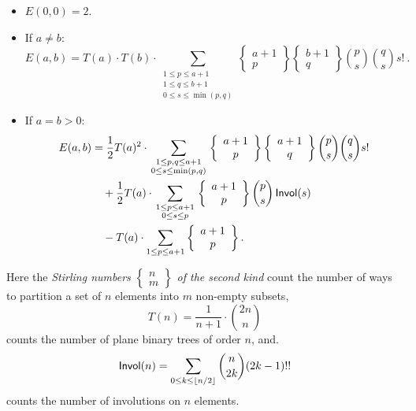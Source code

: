 \begin{itemize}
\item $E(0,0) = 2$.
\item  If $a\neq b$:
$$
E(a,b) = T(a) \cdot T(b) \cdot
\sum_{\begin{smallmatrix} 1 \le p \le a+1 \\ 1 \le q \le b+1 \\ 0 \le s \le \min(p,q) \end{smallmatrix}}
\left\{\begin{array}{c} a+1 \\ p \end{array}\right\}
\left\{\begin{array}{c} b+1 \\ q \end{array}\right\}
\binom{p}{s} \binom{q}{s} s! \ .
$$
\item If $a= b > 0$:
\begin{align*}
  E(a,b) &= \frac{1}{2} T(a)^2 \cdot \sum_{\begin{smallmatrix}1 \le p,q \le a+1\\ 0 \le s \le \min(p,q)\end{smallmatrix}}
  \left\{\begin{array}{c} a+1 \\ p \end{array}\right\}
  \left\{\begin{array}{c} a+1 \\ q \end{array}\right\}
  \binom{p}{s} \binom{q}{s} s! \\
  &\quad + \frac{1}{2} T(a) \cdot \sum_{\begin{smallmatrix}1 \le p \le a+1\\ 0 \le s \le p\end{smallmatrix}}
  \left\{\begin{array}{c} a+1 \\ p \end{array}\right\}
  \binom{p}{s} \, {\sf Invol}(s) \\
  &\quad - T(a) \cdot \sum_{1 \le p \le a+1}
  \left\{\begin{array}{c} a+1 \\ p \end{array}\right\}.
\end{align*}
\end{itemize}

Here the {\it Stirling numbers $\left\{\substack{n\\m}\right\}$ of the second kind} count the number of ways to partition a set of $n$ elements into $m$ non-empty subsets,
$$
T(n) = \frac{1}{n+1} \cdot \binom{2n}{n}
$$
counts the number of plane binary trees of order $n$, and.
$$
{\sf Invol}(n) = \sum_{0 \leq k \leq \lfloor n/2 \rfloor}  \binom{n}{2k} (2k-1)!!
$$
counts the number of involutions on $n$ elements.

